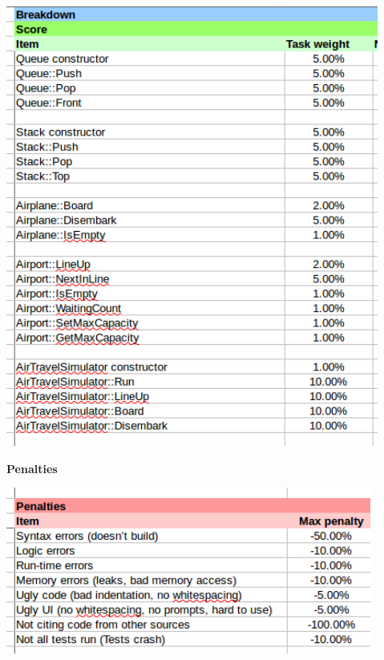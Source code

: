 \documentclass[a4paper,12pt,oneside]{book}
\begin{document}
    \begin{center}
        \includegraphics[height=14.5cm]{images/gradesheet-project2.png}
    \end{center}

    \newpage
    \textbf{Penalties}

    \begin{center}
        \includegraphics[width=12cm]{images/gradesheet-project2-penalties.png}
    \end{center}
\end{document}
